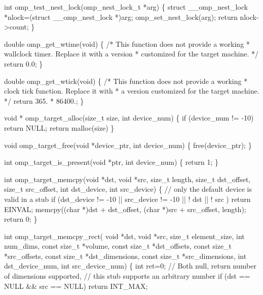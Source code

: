 {\begin{codepar}
int omp\_test\_nest\_lock(omp\_nest\_lock\_t *arg)
\{
    struct \_\_omp\_nest\_lock *nlock=(struct \_\_omp\_nest\_lock *)arg;
    omp\_set\_nest\_lock(arg);
    return nlock->count;
\}

double omp\_get\_wtime(void)
\{
/* This function does not provide a working
 * wallclock timer. Replace it with a version
 * customized for the target machine.
 */
    return 0.0;
\}

double omp\_get\_wtick(void)
\{
/* This function does not provide a working
 * clock tick function. Replace it with
 * a version customized for the target machine.
 */
    return 365. * 86400.;
\}

void * omp\_target\_alloc(size\_t size, int device\_num)
\{
    if (device\_num != -10)
      return NULL;
    return malloc(size)
\}

void omp\_target\_free(void *device\_ptr, int device\_num)
\{
    free(device\_ptr);
\}

int omp\_target\_is\_present(void *ptr, int device\_num)
\{
    return 1;
\}

int omp\_target\_memcpy(void *dst, void *src, size\_t length,
                      size\_t dst\_offset, size\_t src\_offset,
                      int dst\_device, int src\_device)
\{
    // only the default device is valid in a stub
    if (dst\_device != -10 || src\_device != -10
            || ! dst || ! src )
        return EINVAL;
    memcpy((char *)dst + dst\_offset,
           (char *)src + src\_offset,
           length);
    return 0;
\}

int omp\_target\_memcpy\_rect(
    void *dst, void *src,
    size\_t element\_size,
    int num\_dims,
    const size\_t *volume,
    const size\_t *dst\_offsets,
    const size\_t *src\_offsets,
    const size\_t *dst\_dimensions,
    const size\_t *src\_dimensions,
    int dst\_device\_num, int src\_device\_num)
\{
    int ret=0;
    // Both null, return number of dimensions supported,
    // this stub supports an arbitrary number
    if (dst == NULL && src == NULL) return INT\_MAX;


\end{codepar}}
